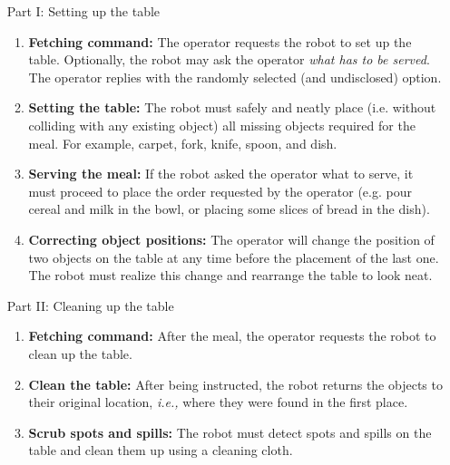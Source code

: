 \begin{itemize}
	\item[Part I:] Setting up the table
	\begin{enumerate}
		\item \textbf{Fetching command:} The operator requests the robot to set up the table. Optionally, the robot may ask the operator \textit{what has to be served}. The operator replies with the randomly selected (and undisclosed) option. \label{sattu:option}

		\item \textbf{Setting the table:} The robot must safely and neatly place (i.e. without colliding with any existing object) all missing objects required for the meal. For example, carpet, fork, knife, spoon, and dish.

		\item \textbf{Serving the meal:} If the robot asked the operator what to serve, it must proceed to place the order requested by the operator (e.g. pour cereal and milk in the bowl, or placing some slices of bread in the dish).

		\item \textbf{Correcting object positions:} The operator will change the position of two objects on the table at any time before the placement of the last one. The robot must realize this change and rearrange the table to look neat.
	\end{enumerate}

	\item[Part II:] Cleaning up the table
	\begin{enumerate}
		\item \textbf{Fetching command:} After the meal, the operator requests the robot to clean up the table.

		\item \textbf{Clean the table:} After being instructed, the robot returns the objects to their original location, \textit{i.e.,} where they were found in the first place.

		\item \textbf{Scrub spots and spills:} The robot must detect spots and spills on the table and clean them up using a cleaning cloth.
	\end{enumerate}
\end{itemize}

